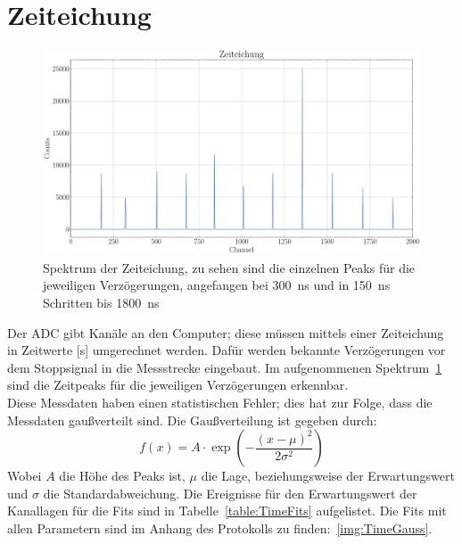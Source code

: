 \documentclass[12pt,a4paper,ngerman]{report}
\begin{document}
	\section{Zeiteichung}
	\begin{figure}[ht]
		\centering
		\includegraphics[width=\textwidth]{Bilder/zeitEich.pdf}		
		\caption[Spektrum der Zeiteichung]{Spektrum der Zeiteichung, zu sehen sind die einzelnen Peaks für die jeweiligen Verzögerungen, angefangen bei \SI{300}{\nano \s} und in \SI{150}{\nano \s} Schritten bis \SI{1800}{\nano \s}}
		\label{img:zeitEich}
	\end{figure}
	Der ADC gibt Kanäle an den Computer; diese müssen mittels einer Zeiteichung in Zeitwerte [s] umgerechnet werden. Dafür werden bekannte Verzögerungen vor dem Stoppsignal in die Messstrecke eingebaut. Im aufgenommenen Spektrum~\ref{img:zeitEich} sind die Zeitpeaks für die jeweiligen Verzögerungen erkennbar.\\
	Diese Messdaten haben einen statistischen Fehler; dies hat zur Folge, dass die Messdaten gaußverteilt sind. Die Gaußverteilung ist gegeben durch:
	\begin{equation}
		f(x) = A \cdot \exp\left(- \frac{(x-\mu)^2}{2 \sigma ^2}\right)
	\end{equation}
	Wobei $A$ die Höhe des Peaks ist, $\mu$ die Lage, beziehungsweise der Erwartungswert und $\sigma$ die Standardabweichung. Die Ereignisse für den Erwartungswert der Kanallagen für die Fits sind in Tabelle~\ref{table:TimeFits} aufgelistet. Die Fits mit allen Parametern sind im Anhang des Protokolls zu finden:~\ref{img:TimeGauss}.
\end{document}
